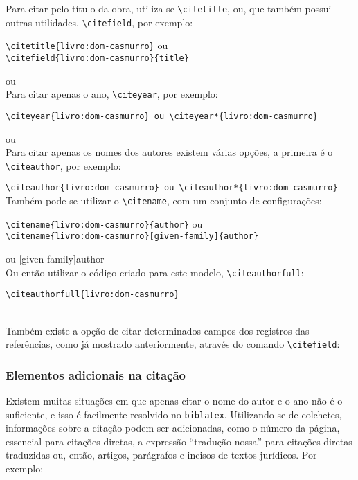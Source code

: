Para citar pelo título da obra, utiliza-se \verb|\citetitle|, ou, que também possui outras utilidades, \verb|\citefield|, por exemplo: 

\verb|\citetitle{livro:dom-casmurro}| ou \\\verb|\citefield{livro:dom-casmurro}{title}|

 ou \\

Para citar apenas o ano, \verb|\citeyear|, por exemplo: 

\verb|\citeyear{livro:dom-casmurro} ou \citeyear*{livro:dom-casmurro}|

\citeyear{livro:dom-casmurro} ou \citeyear*{livro:dom-casmurro}\\

Para citar apenas os nomes dos autores existem várias opções, a primeira é o \verb|\citeauthor|, por exemplo: 

\verb|\citeauthor{livro:dom-casmurro} ou \citeauthor*{livro:dom-casmurro}|\\

Também pode-se utilizar o \verb|\citename|, com um conjunto de configurações: 

\verb|\citename{livro:dom-casmurro}{author}| ou \\\verb|\citename{livro:dom-casmurro}[given-family]{author}|

 ou [given-family]{author}\\

Ou então utilizar o código criado para este modelo, \verb|\citeauthorfull|\footnotemark:

\verb|\citeauthorfull{livro:dom-casmurro}|

\\

Também existe a opção de citar determinados campos dos registros das referências, como já mostrado anteriormente, através do comando \verb|\citefield|:

\subsubsection{Elementos adicionais na citação}
Existem muitas situações em que apenas citar o nome do autor e o ano não é o suficiente, e isso é facilmente resolvido no \verb|biblatex|. Utilizando-se de colchetes, informações sobre a citação podem ser adicionadas, como o número da página, essencial para citações diretas, a expressão ``tradução nossa'' para citações diretas traduzidas ou, então, artigos, parágrafos e incisos de textos jurídicos. Por exemplo:

